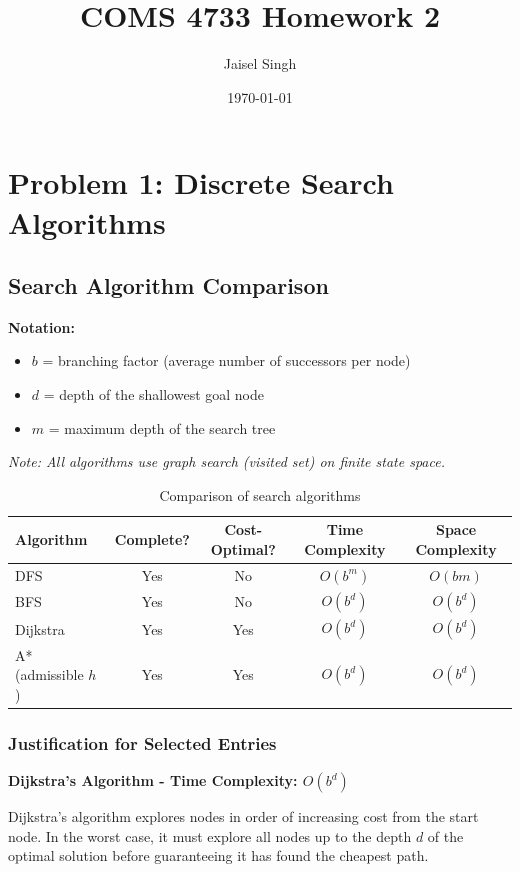 \documentclass[11pt]{article}
\title{COMS 4733 Homework 2}
\author{Jaisel Singh}
\date{\today}
\begin{document}
\maketitle
\section{Problem 1: Discrete Search Algorithms}
\subsection{Search Algorithm Comparison}
\noindent\textbf{Notation:}
\begin{itemize}
\item $b$ = branching factor (average number of successors per node)
\item $d$ = depth of the shallowest goal node
\item $m$ = maximum depth of the search tree
\end{itemize}
\noindent\textit{Note: All algorithms use graph search (visited set) on finite state space.}

\begin{table}[h]
\centering
\begin{tabular}{|l|c|c|c|c|}
\hline
\textbf{Algorithm} & \textbf{Complete?} & \textbf{Cost-Optimal?} & \textbf{Time Complexity} & \textbf{Space Complexity} \\
\hline
DFS & Yes & No & $O(b^m)$ & $O(bm)$ \\
\hline
BFS & Yes & No & $O(b^d)$ & $O(b^d)$ \\
\hline
Dijkstra & Yes & Yes & $O(b^d)$ & $O(b^d)$ \\
\hline
A* (admissible $h$) & Yes & Yes & $O(b^d)$ & $O(b^d)$ \\
\hline
\end{tabular}
\caption{Comparison of search algorithms}
\label{tab:search_comparison}
\end{table}

\subsubsection{Justification for Selected Entries}

\textbf{Dijkstra's Algorithm - Time Complexity: $O(b^d)$}

Dijkstra's algorithm explores nodes in order of increasing cost from the start node. In the worst case, it must explore all nodes up to the depth $d$ of the optimal solution before guaranteeing it has found the cheapest path.
\end{document}
